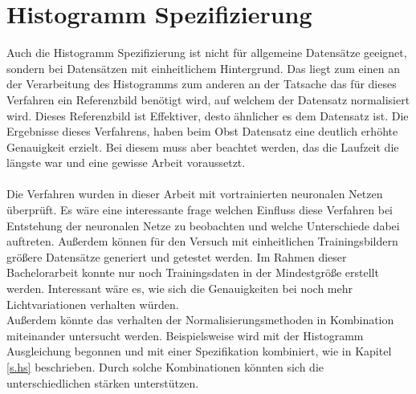 \section{Histogramm Spezifizierung}
Auch die Histogramm Spezifizierung ist nicht für allgemeine Datensätze geeignet, sondern bei Datensätzen mit einheitlichem Hintergrund. Das liegt zum einen an der Verarbeitung des Histogramms zum anderen an der Tatsache das für dieses Verfahren ein Referenzbild benötigt wird, auf welchem der Datensatz normalisiert wird. Dieses Referenzbild ist Effektiver, desto ähnlicher es dem Datensatz ist. Die Ergebnisse dieses Verfahrens, haben beim Obst Datensatz eine deutlich erhöhte Genauigkeit erzielt. Bei diesem muss aber beachtet werden, das die Laufzeit die längste war und eine gewisse Arbeit voraussetzt.\\\\
Die Verfahren wurden in dieser Arbeit mit vortrainierten neuronalen Netzen überprüft. Es wäre eine interessante frage welchen Einfluss diese Verfahren bei Entstehung der neuronalen Netze zu beobachten und welche Unterschiede dabei auftreten. Außerdem können für den Versuch mit einheitlichen Trainingsbildern größere Datensätze generiert und getestet werden. Im Rahmen dieser Bachelorarbeit konnte nur noch Trainingsdaten in der Mindestgröße erstellt werden. Interessant wäre es, wie sich die Genauigkeiten bei noch mehr Lichtvariationen verhalten würden.\\
Außerdem könnte das verhalten der Normalisierungsmethoden in Kombination miteinander untersucht werden. Beispielsweise wird mit der Histogramm Ausgleichung begonnen und mit einer Spezifikation kombiniert, wie in Kapitel \ref{s.hs} beschrieben. Durch solche Kombinationen könnten sich die unterschiedlichen stärken unterstützen.  